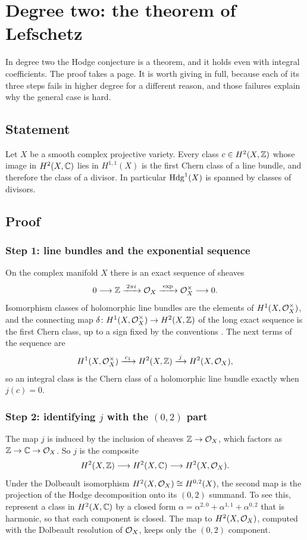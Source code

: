 \chapter{Degree two: the theorem of Lefschetz}\label{ch:lefschetz}

In degree two the Hodge conjecture is a theorem, and it holds even with
integral coefficients. The proof takes a page. It is worth giving in
full, because each of its three steps fails in higher degree for a
different reason, and those failures explain why the general case is
hard.

\section{Statement}

\begin{theorem}[Lefschetz]\label{thm:lefschetz11}
Let $X$ be a smooth complex projective variety. Every class
$c\in H^{2}(X,\mathbb{Z})$ whose image in $H^{2}(X,\mathbb{C})$ lies in $H^{1,1}(X)$ is
the first Chern class of a line bundle, and therefore the class of a
divisor. In particular $\operatorname{Hdg}^{1}(X)$ is spanned by classes of divisors.
\end{theorem}

\section{Proof}

\subsection*{Step 1: line bundles and the exponential sequence}
On the complex manifold $X$ there is an exact sequence of sheaves
\[
  0\longrightarrow\mathbb{Z}\xrightarrow{\;2\pi i\;}\mathcal{O}_{X}
  \xrightarrow{\;\exp\;}\mathcal{O}_{X}^{\times}\longrightarrow0 .
\]
Isomorphism classes of holomorphic line bundles are the elements of
$H^{1}(X,\mathcal{O}_{X}^{\times})$, and the connecting map
$\delta\colon H^{1}(X,\mathcal{O}_{X}^{\times})\to H^{2}(X,\mathbb{Z})$ of the long exact
sequence is the first Chern class, up to a sign fixed by the
conventions \cite[p.~139]{GH78}. The next terms of the sequence are
\[
  H^{1}(X,\mathcal{O}_{X}^{\times})\xrightarrow{\;c_{1}\;}H^{2}(X,\mathbb{Z})
  \xrightarrow{\;j\;}H^{2}(X,\mathcal{O}_{X}),
\]
so an integral class is the Chern class of a holomorphic line bundle
exactly when $j(c)=0$.

\subsection*{Step 2: identifying $j$ with the $(0,2)$ part}
The map $j$ is induced by the inclusion of sheaves $\mathbb{Z}\to\mathcal{O}_{X}$, which
factors as $\mathbb{Z}\to\mathbb{C}\to\mathcal{O}_{X}$. So $j$ is the composite
\[
  H^{2}(X,\mathbb{Z})\longrightarrow H^{2}(X,\mathbb{C})\longrightarrow H^{2}(X,\mathcal{O}_{X}).
\]
Under the Dolbeault isomorphism $H^{2}(X,\mathcal{O}_{X})\cong H^{0,2}(X)$, the
second map is the projection of the Hodge decomposition onto its $(0,2)$
summand. To see this, represent a class in $H^{2}(X,\mathbb{C})$ by a closed form
$\alpha=\alpha^{2,0}+\alpha^{1,1}+\alpha^{0,2}$ that is harmonic, so that
each component is closed. The map to $H^{2}(X,\mathcal{O}_{X})$, computed with the
Dolbeault resolution of $\mathcal{O}_{X}$, keeps only the $(0,2)$ component.

